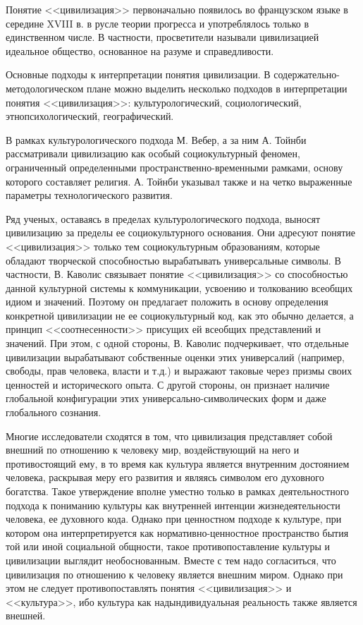 Понятие <<цивилизация>> первоначально появилось во французском языке в 
середине XVIII в. в русле теории прогресса и употреблялось только в 
единственном числе. В частности, просветители называли цивилизацией идеальное 
общество, основанное на разуме и справедливости.

Основные подходы к интерпретации понятия цивилизации. В содержательно-
методологическом плане можно выделить несколько подходов в интерпретации 
понятия <<цивилизация>>: культурологический, социологический, 
этнопсихологический, географический.

В рамках культурологического подхода М. Вебер, а за ним А. Тойнби 
рассматривали цивилизацию как особый социокультурный феномен, ограниченный 
определенными пространственно-временными рамками, основу которого составляет 
религия. А. Тойнби указывал также и на четко выраженные параметры 
технологического развития. 

Ряд ученых, оставаясь в пределах культурологического подхода, выносят 
цивилизацию за пределы ее социокультурного основания. Они адресуют понятие 
<<цивилизация>> только тем социокультурным образованиям, которые обладают 
творческой способностью вырабатывать универсальные символы. В частности, 
В. Каволис связывает понятие <<цивилизация>> со способностью данной культурной 
системы к коммуникации, усвоению и толкованию всеобщих идиом и значений. 
Поэтому он предлагает положить в основу определения конкретной цивилизации 
не ее социокультурный код, как это обычно делается, а принцип 
<<соотнесенности>> присущих ей всеобщих представлений и значений. При этом, с 
одной стороны, В. Каволис подчеркивает, что отдельные цивилизации вырабатывают 
собственные оценки этих универсалий (например, свободы, прав человека, власти 
и т.д.) и выражают таковые через призмы своих ценностей и исторического опыта. 
С другой стороны, он признает наличие глобальной конфигурации этих 
универсально-символических форм и даже глобального сознания.

Многие исследователи сходятся в том, что цивилизация представляет собой 
внешний по отношению к человеку мир, воздействующий на него и противостоящий 
ему, в то время как культура является внутренним достоянием человека, 
раскрывая меру его развития и являясь символом его духовного богатства. Такое 
утверждение вполне уместно только в рамках деятельностного подхода к пониманию 
культуры как внутренней интенции жизнедеятельности человека, ее духовного 
кода. Однако при ценностном подходе к культуре, при котором она 
интерпретируется как нормативно-ценностное пространство бытия той или иной 
социальной общности, такое противопоставление культуры и цивилизации выглядит 
необоснованным. Вместе с тем надо согласиться, что цивилизация по отношению к 
человеку является внешним миром. Однако при этом не следует противопоставлять 
понятия <<цивилизация>> и <<культура>>, ибо культура как надындивидуальная 
реальность также является внешней.


